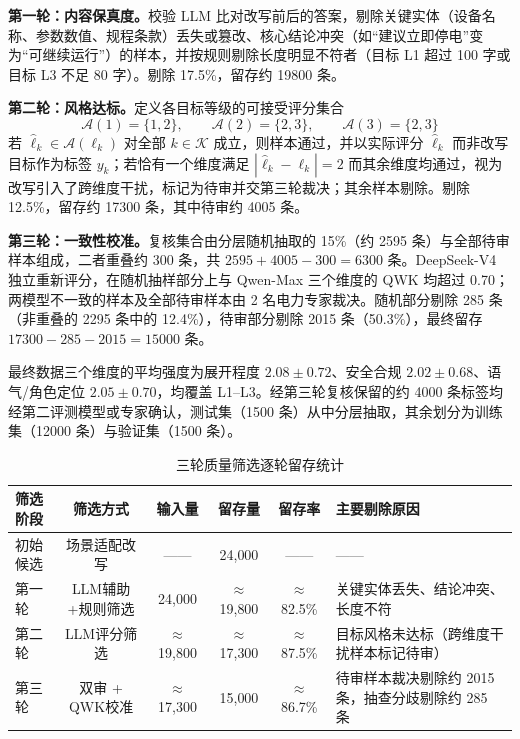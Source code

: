 \documentclass[fontset=fandol,type=master,campus=shenzhen,etitleauto=true]{hithesisbook}
\begin{document}
\textbf{第一轮：内容保真度。}校验 LLM 比对改写前后的答案，剔除关键实体（设备名称、参数数值、规程条款）丢失或篡改、核心结论冲突（如“建议立即停电”变为“可继续运行”）的样本，并按规则剔除长度明显不符者（目标 L1 超过 100 字或目标 L3 不足 80 字）。剔除 17.5\%，留存约 19800 条。

\textbf{第二轮：风格达标。}定义各目标等级的可接受评分集合
\begin{equation}\label{eq:accept-level}
\mathcal{A}(1) = \{1, 2\}, \qquad \mathcal{A}(2) = \{2, 3\}, \qquad \mathcal{A}(3) = \{2, 3\}
\end{equation}
若 $\hat{\ell}_k \in \mathcal{A}(\ell_k)$ 对全部 $k \in \mathcal{K}$ 成立，则样本通过，并以实际评分 $\hat{\ell}_k$ 而非改写目标作为标签 $y_k$；若恰有一个维度满足 $|\hat{\ell}_k - \ell_k| = 2$ 而其余维度均通过，视为改写引入了跨维度干扰，标记为待审并交第三轮裁决；其余样本剔除。剔除 12.5\%，留存约 17300 条，其中待审约 4005 条。

\textbf{第三轮：一致性校准。}复核集合由分层随机抽取的 15\%（约 2595 条）与全部待审样本组成，二者重叠约 300 条，共 $2595 + 4005 - 300 = 6300$ 条。DeepSeek-V4 独立重新评分，在随机抽样部分上与 Qwen-Max 三个维度的 QWK 均超过 0.70；两模型不一致的样本及全部待审样本由 2 名电力专家裁决。随机部分剔除 285 条（非重叠的 2295 条中的 12.4\%），待审部分剔除 2015 条（50.3\%），最终留存 $17300 - 285 - 2015 = 15000$ 条。

最终数据三个维度的平均强度为展开程度 $2.08 \pm 0.72$、安全合规 $2.02 \pm 0.68$、语气/角色定位 $2.05 \pm 0.70$，均覆盖 L1--L3。经第三轮复核保留的约 4000 条标签均经第二评测模型或专家确认，测试集（1500 条）从中分层抽取，其余划分为训练集（12000 条）与验证集（1500 条）。

\begin{table}[htbp]
\centering
\caption{三轮质量筛选逐轮留存统计}
\label{tab:style-data-dist}
\small
\setlength{\tabcolsep}{4pt}
\renewcommand{\arraystretch}{1.1}
\begin{tabular}{l c c c c p{4.2cm}}
\toprule
\textbf{筛选阶段} & \textbf{筛选方式} & \textbf{输入量} & \textbf{留存量} & \textbf{留存率} & \textbf{主要剔除原因} \\
\midrule
初始候选   & 场景适配改写  &  ——   & 24{,}000 &  ——    &  —— \\
第一轮     & LLM辅助+规则筛选 & 24{,}000 & $\approx$19{,}800 & $\approx$82.5\% & 关键实体丢失、结论冲突、长度不符 \\
第二轮     & LLM评分筛选   & $\approx$19{,}800 & $\approx$17{,}300 & $\approx$87.5\% & 目标风格未达标（跨维度干扰样本标记待审） \\
第三轮     & 双审 + QWK校准 & $\approx$17{,}300 & 15{,}000 & $\approx$86.7\% & 待审样本裁决剔除约 2015 条，抽查分歧剔除约 285 条 \\
\bottomrule
\end{tabular}
\end{table}
\end{document}
